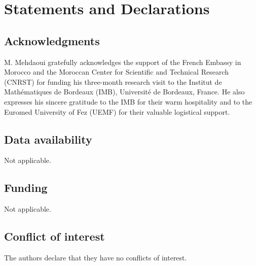 \documentclass[10pt,number,preprint,times]{elsarticle}
\numberwithin{equation}{section} %
\begin{document}
\section*{Statements and Declarations}
\subsection*{Acknowledgments}
M. Mehdaoui gratefully acknowledges the support of the French Embassy in Morocco and the Moroccan Center for Scientific and Technical Research (CNRST) for funding his three-month research visit to the Institut de Mathématiques de Bordeaux (IMB), Université de Bordeaux, France. He also expresses his sincere gratitude to the IMB for their warm hospitality and to the Euromed University of Fez (UEMF) for their valuable logistical support.
\subsection*{Data availability}
Not applicable.
\subsection*{Funding}
Not applicable.
\subsection*{Conflict of interest}
The authors declare that they have no conflicts of interest.





\end{document}
